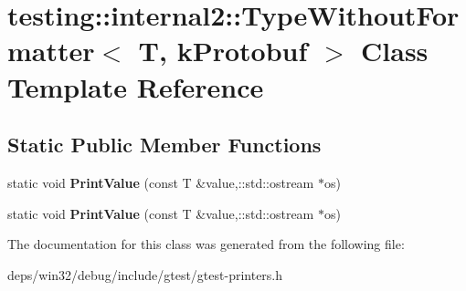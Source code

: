 \hypertarget{classtesting_1_1internal2_1_1_type_without_formatter_3_01_t_00_01k_protobuf_01_4}{}\section{testing\+:\+:internal2\+:\+:Type\+Without\+Formatter$<$ T, k\+Protobuf $>$ Class Template Reference}
\label{classtesting_1_1internal2_1_1_type_without_formatter_3_01_t_00_01k_protobuf_01_4}
\subsection*{Static Public Member Functions}
\begin{DoxyCompactItemize}
\item 
\hypertarget{classtesting_1_1internal2_1_1_type_without_formatter_3_01_t_00_01k_protobuf_01_4_a714da93952c590db954228bd9cc60abf}{}static void {\bfseries Print\+Value} (const T \&value,\+::std\+::ostream $\ast$os)\label{classtesting_1_1internal2_1_1_type_without_formatter_3_01_t_00_01k_protobuf_01_4_a714da93952c590db954228bd9cc60abf}

\item 
\hypertarget{classtesting_1_1internal2_1_1_type_without_formatter_3_01_t_00_01k_protobuf_01_4_a714da93952c590db954228bd9cc60abf}{}static void {\bfseries Print\+Value} (const T \&value,\+::std\+::ostream $\ast$os)\label{classtesting_1_1internal2_1_1_type_without_formatter_3_01_t_00_01k_protobuf_01_4_a714da93952c590db954228bd9cc60abf}

\end{DoxyCompactItemize}


The documentation for this class was generated from the following file\+:\begin{DoxyCompactItemize}
\item 
deps/win32/debug/include/gtest/gtest-\/printers.\+h\end{DoxyCompactItemize}
